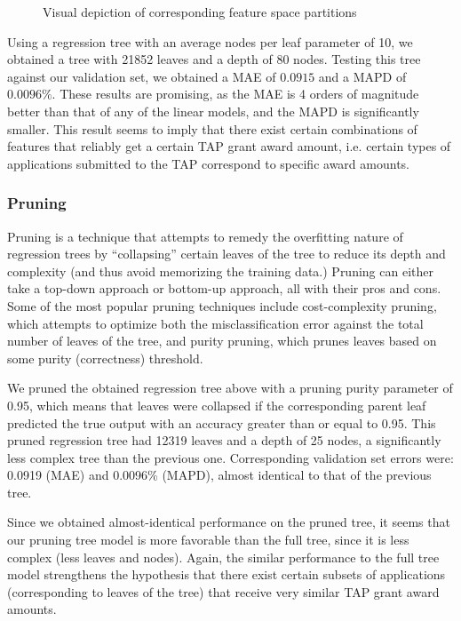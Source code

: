 \documentclass[12pt, fleqn]{article}
\begin{document}
\begin{figure}
\begin{minipage}[c]{0.4\linewidth}
		\caption{Visual depiction of corresponding feature space partitions}
	\end{minipage}
	\end{figure}

	Using a regression tree with an average nodes per leaf parameter of 10, we obtained a tree with 21852 leaves and a depth of 80 nodes. Testing this tree against our validation set, we obtained a MAE of $0.0915$ and a MAPD of $0.0096\%$. These results are promising, as the MAE is 4 orders of magnitude better than that of any of the linear models, and the MAPD is significantly smaller. This result seems to imply that there exist certain combinations of features that reliably get a certain TAP grant award amount, i.e. certain types of applications submitted to the TAP correspond to specific award amounts.
	

\subsubsection{Pruning}
	Pruning is a technique that attempts to remedy the overfitting nature of regression trees by ``collapsing'' certain leaves of the tree to reduce its depth and complexity (and thus avoid memorizing the training data.) Pruning can either take a top-down approach or bottom-up approach, all with their pros and cons. Some of the most popular pruning techniques include cost-complexity pruning, which attempts to optimize both the misclassification error against the total number of leaves of the tree, and purity pruning, which prunes leaves based on some purity (correctness) threshold.

	We pruned the obtained regression tree above with a pruning purity parameter of 0.95, which means that leaves were collapsed if the corresponding parent leaf predicted the true output with an accuracy greater than or equal to 0.95. This pruned regression tree had 12319 leaves and a depth of 25 nodes, a significantly less complex tree than the previous one. Corresponding validation set errors were: 0.0919 (MAE) and 0.0096\% (MAPD), almost identical to that of the previous tree. 

	Since we obtained almost-identical performance on the pruned tree, it seems that our pruning tree model is more favorable than the full tree, since it is less complex (less leaves and nodes). Again, the similar performance to the full tree model strengthens the hypothesis that there exist certain subsets of applications (corresponding to leaves of the tree) that receive very similar TAP grant award amounts.
\end{document}
